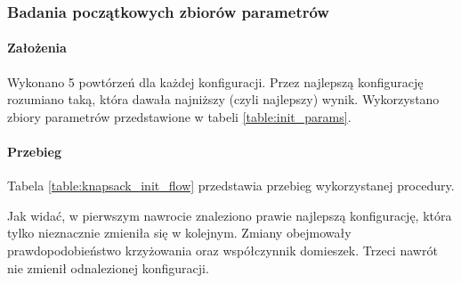 \documentclass[./FM_mgr.tex]{subfiles}
\begin{document}
\subsubsection{Badania początkowych zbiorów parametrów}

\paragraph{Założenia} Wykonano 5 powtórzeń dla każdej konfiguracji.
Przez najlepszą konfigurację rozumiano taką, która dawała najniższy (czyli najlepszy) wynik.
Wykorzystano zbiory parametrów przedstawione w tabeli \ref{table:init_params}.

\paragraph{Przebieg}

Tabela \ref{table:knapsack_init_flow} przedstawia przebieg wykorzystanej procedury.

Jak widać, w pierwszym nawrocie znaleziono prawie najlepszą konfigurację, która tylko nieznacznie zmieniła się w kolejnym. 
Zmiany obejmowały prawdopodobieństwo krzyżowania oraz współczynnik domieszek.
Trzeci nawrót nie zmienił odnalezionej konfiguracji.
\end{document}
